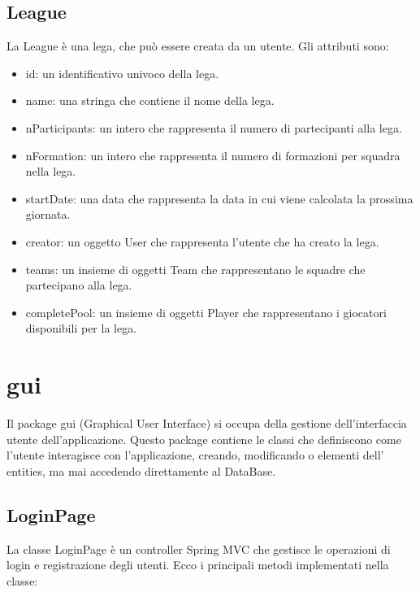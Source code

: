 \documentclass[twoside,openright,titlepage,fleqn,headinclude,12pt,a4paper,BCOR=5mm,footinclude]{scrbook}
\begin{document}
\subsection{League} 
La League è una lega, che può essere creata da un utente. Gli attributi sono:  

\begin{itemize} 
    \item id: un identificativo univoco della lega. 
    \item name: una stringa che contiene il nome della lega. 
    \item nParticipants: un intero che rappresenta il numero di partecipanti alla lega. 
    \item nFormation: un intero che rappresenta il numero di formazioni per squadra nella lega. 
    \item startDate: una data che rappresenta la data in cui viene calcolata la prossima giornata.
    \item creator: un oggetto User che rappresenta l'utente che ha creato la lega. 
    \item teams: un insieme di oggetti Team che rappresentano le squadre che partecipano alla lega. 
    \item completePool: un insieme di oggetti Player che rappresentano i giocatori disponibili per la lega. 
\end{itemize}

\section{gui}
Il package gui (Graphical User Interface) si occupa della gestione dell'interfaccia utente dell'applicazione. Questo package contiene le classi che definiscono come l'utente interagisce con l'applicazione, creando, modificando o elementi dell' entities, ma mai accedendo direttamente al DataBase.

\subsection{LoginPage}
La classe LoginPage è un controller Spring MVC che gestisce le operazioni di login e registrazione degli utenti. Ecco i principali metodi implementati nella classe: 
\end{document}
